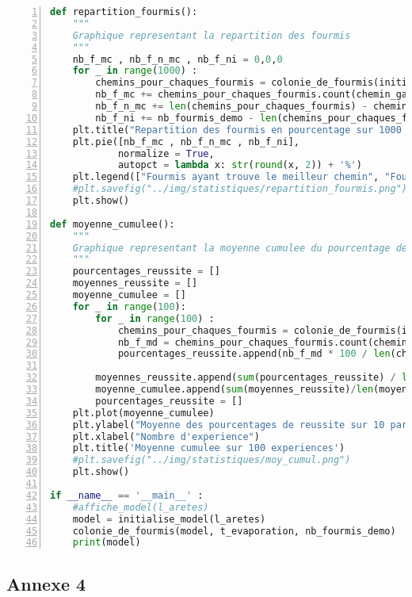 \documentclass[
12pt,
french,
]{article}
\begin{document}
\begin{lstlisting}[language=Python, numbers=left, label=colonies_fourmis]
def repartition_fourmis():
    """
    Graphique representant la repartition des fourmis
    """
    nb_f_mc , nb_f_n_mc , nb_f_ni = 0,0,0
    for _ in range(1000) :
        chemins_pour_chaques_fourmis = colonie_de_fourmis(initialise_model(l_aretes),t_evaporation, nb_fourmis_demo)
        nb_f_mc += chemins_pour_chaques_fourmis.count(chemin_gagnant)
        nb_f_n_mc += len(chemins_pour_chaques_fourmis) - chemins_pour_chaques_fourmis.count(chemin_gagnant)
        nb_f_ni += nb_fourmis_demo - len(chemins_pour_chaques_fourmis)
    plt.title("Repartition des fourmis en pourcentage sur 1000 parties")
    plt.pie([nb_f_mc , nb_f_n_mc , nb_f_ni],
            normalize = True,
            autopct = lambda x: str(round(x, 2)) + '%')
    plt.legend(["Fourmis ayant trouve le meilleur chemin", "Fourmis ayant trouve la nourriture mais pas le meilleur chemin" , "Fourmis n'ayant pas trouve la nourriture"])
    #plt.savefig("../img/statistiques/repartition_fourmis.png")
    plt.show()

def moyenne_cumulee():
    """
    Graphique representant la moyenne cumulee du pourcentage de parties gagnee
    """
    pourcentages_reussite = []
    moyennes_reussite = []
    moyenne_cumulee = []
    for _ in range(100):
        for _ in range(100) :
            chemins_pour_chaques_fourmis = colonie_de_fourmis(initialise_model(l_aretes),t_evaporation, nb_fourmis_demo)
            nb_f_md = chemins_pour_chaques_fourmis.count(chemin_gagnant)
            pourcentages_reussite.append(nb_f_md * 100 / len(chemins_pour_chaques_fourmis))

        moyennes_reussite.append(sum(pourcentages_reussite) / len(pourcentages_reussite))
        moyenne_cumulee.append(sum(moyennes_reussite)/len(moyennes_reussite))
        pourcentages_reussite = []
    plt.plot(moyenne_cumulee)
    plt.ylabel("Moyenne des pourcentages de reussite sur 10 parties")
    plt.xlabel("Nombre d'experience")
    plt.title('Moyenne cumulee sur 100 experiences')
    #plt.savefig("../img/statistiques/moy_cumul.png")
    plt.show()

if __name__ == '__main__' :
    #affiche_model(l_aretes)
    model = initialise_model(l_aretes)
    colonie_de_fourmis(model, t_evaporation, nb_fourmis_demo)
    print(model)
\end{lstlisting}

\hypertarget{annexe-4}{%
\subsection{Annexe 4}\label{annexe-4}}
\end{document}
